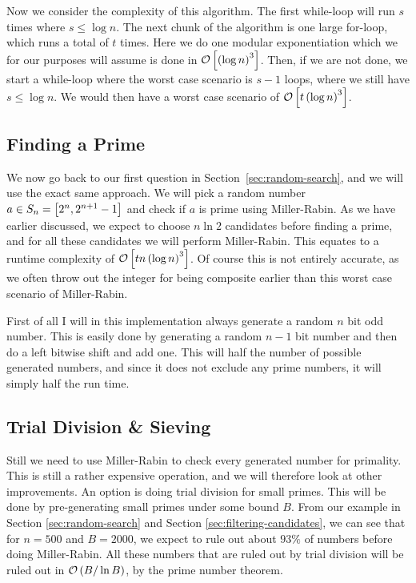   Now we consider the complexity of this algorithm.
  The first while-loop will run $s$ times where $s \leq \log n$.
  The next chunk of the algorithm is one large for-loop, which runs a total of $t$ times.
  Here we do one modular exponentiation which we for our purposes will assume is done in $\mathcal{O} \left[  \left(  \log n  \right)^3 \right]$.
  Then, if we are not done, we start a while-loop where the worst case scenario is $s-1$ loops, where we still have $s \leq \log n$.
  We would then have a worst case scenario of $\mathcal{O} \left[  t \left(  \log n  \right)^3  \right]$.


\subsection{Finding a Prime}
  We now go back to our first question in Section~\ref{sec:random-search}, and we will use the exact same approach.
  We will pick a random number $a \in S_n = \left[  2^n, 2^{n+1}-1  \right]$ and check if $a$ is prime using Miller-Rabin.
  As we have earlier discussed, we expect to choose $n \ln 2$ candidates before finding a prime, and for all these candidates we will perform Miller-Rabin.
  This equates to a runtime complexity of $\mathcal{O} \left[  t n \left(  \log n  \right)^3  \right]$.
  Of course this is not entirely accurate, as we often throw out the integer for being composite earlier than this worst case scenario of Miller-Rabin.

  First of all I will in this implementation always generate a random $n$ bit odd number.
  This is easily done by generating a random $n-1$ bit number and then do a left bitwise shift and add one.
  This will half the number of possible generated numbers, and since it does not exclude any prime numbers, it will simply half the run time.


\subsection{Trial Division \& Sieving}
  Still we need to use Miller-Rabin to check every generated number for primality.
  This is still a rather expensive operation, and we will therefore look at other improvements.
  An option is doing trial division for small primes.
  This will be done by pre-generating small primes under some bound $B$.
  From our example in Section \ref{sec:random-search} and Section \ref{sec:filtering-candidates}, we can see that for $n=500$ and $B=2000$, we expect to rule out about $93\%$ of numbers before doing Miller-Rabin.
  All these numbers that are ruled out by trial division will be ruled out in $\mathcal{O} \left(  B/\ln B  \right)$, by the prime number theorem.

